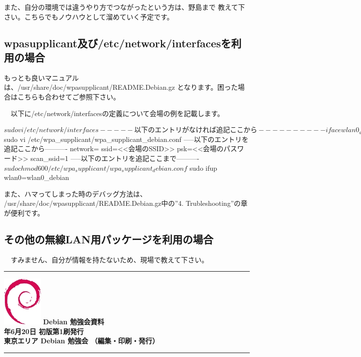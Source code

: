 \documentclass[mingoth,a4paper]{jsarticle}
\newcommand{\debmtgyear}{2015}
\newcommand{\debmtgmonth}{6}
\newcommand{\debmtgdate}{20}
\begin{document}
 また、自分の環境では違うやり方でつながったという方は、野島まで
教えて下さい。こちらでもノウハウとして溜めていく予定です。

 \subsection{wpasupplicant及び/etc/network/interfacesを利用の場合}

 もっとも良いマニュアルは、/usr/share/doc/wpasupplicant/README.Debian.gz
となります。困った場合はこちらも合わせてご参照下さい。

　以下に/etc/network/interfacesの定義について会場の例を記載します。

\begin{commandline}
$ sudo vi /etc/network/interfaces
-----以下のエントリがなければ追記ここから----------
iface wlan0_debian inet dhcp
     wpa-conf /etc/wpa_supplicant/wpa_supplicant_debian.conf
-----以下のエントリがなければ追記ここまで----------
$ sudo vi /etc/wpa_supplicant/wpa_supplicant_debian.conf
-----以下のエントリを追記ここから----------
network={
     ssid=<<会場のSSID>>
     psk=<<会場のパスワード>>
     scan_ssid=1
}
-----以下のエントリを追記ここまで----------
$ sudo chmod 600 /etc/wpa_supplicant/wpa_supplicant_debian.conf
$ sudo ifup wlan0=wlan0_debian
\end{commandline}

 また、ハマってしまった時のデバッグ方法は、
/usr/share/doc/wpasupplicant/README.Debian.gz中の''4. Trubleshooting''の章が便利です。

 \subsection{その他の無線LAN用パッケージを利用の場合}

　すみません、自分が情報を持たないため、現場で教えて下さい。

\cleartooddpage

\vspace*{15cm}
\hrule
\vspace{2mm}
\includegraphics[width=2cm]{image200502/openlogo-nd.eps}
\noindent \Large \bf Debian 勉強会資料\\
\noindent \normalfont \debmtgyear{}年\debmtgmonth{}月\debmtgdate{}日 \hspace{5mm}  初版第1刷発行\\
\noindent \normalfont 東京エリア Debian 勉強会 （編集・印刷・発行）\\
\hrule
\end{document}
